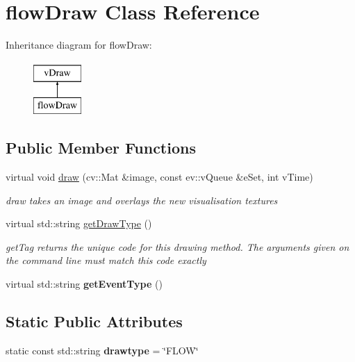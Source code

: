 \hypertarget{classflowDraw}{}\section{flow\+Draw Class Reference}
\label{classflowDraw}
Inheritance diagram for flow\+Draw\+:\begin{figure}[H]
\begin{center}
\leavevmode
\includegraphics[height=2.000000cm]{classflowDraw}
\end{center}
\end{figure}
\subsection*{Public Member Functions}
\begin{DoxyCompactItemize}
\item 
virtual void \hyperlink{classflowDraw_a77d2abe2722b41f045bbea415ac0c858}{draw} (cv\+::\+Mat \&image, const ev\+::v\+Queue \&e\+Set, int v\+Time)
\begin{DoxyCompactList}\small\item\em draw takes an image and overlays the new visualisation textures \end{DoxyCompactList}\item 
virtual std\+::string \hyperlink{classflowDraw_a9b2f0523a05825d3d375b43126f6840e}{get\+Draw\+Type} ()
\begin{DoxyCompactList}\small\item\em get\+Tag returns the unique code for this drawing method. The arguments given on the command line must match this code exactly \end{DoxyCompactList}\item 
virtual std\+::string {\bfseries get\+Event\+Type} ()\hypertarget{classflowDraw_a9fd758baf18d8a518734b625521a188a}{}\label{classflowDraw_a9fd758baf18d8a518734b625521a188a}

\end{DoxyCompactItemize}
\subsection*{Static Public Attributes}
\begin{DoxyCompactItemize}
\item 
static const std\+::string {\bfseries drawtype} = \char`\"{}F\+L\+OW\char`\"{}\hypertarget{classflowDraw_a80a59d68527e7125aa574fde2970abeb}{}\label{classflowDraw_a80a59d68527e7125aa574fde2970abeb}

\end{DoxyCompactItemize}
